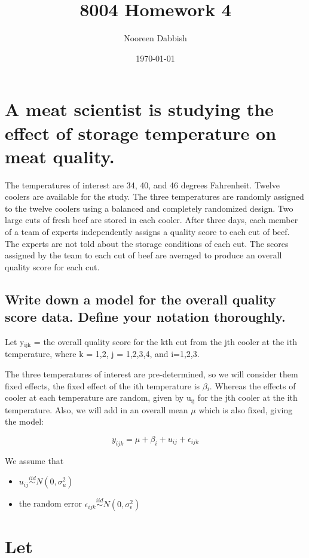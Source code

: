 \documentclass[11pt]{article}
\title{8004 Homework 4}
\author{Nooreen Dabbish}
\date{\today}
\begin{document}
\maketitle




\section{A meat scientist is studying the effect of storage temperature on meat quality.}
\label{sec-1}

The temperatures of interest are 34, 40, and 46 degrees Fahrenheit. Twelve coolers are available for the study. The three temperatures are randomly assigned to the twelve coolers using a balanced and completely randomized design. Two large cuts of fresh beef are stored in each cooler. After three days, each member of a team of experts independently assigns a quality score to each cut of beef. The experts are not told about the storage conditions of each cut. The scores assigned by the team to each cut of beef are averaged to produce an overall quality score for each cut.
\subsection{Write down a model for the overall quality score data. Define your notation thoroughly.}
\label{sec-1-1}


Let y$_{\mathrm{ijk}}$ = the overall quality score for the kth cut from the jth
cooler at the ith temperature, where k = 1,2, j = 1,2,3,4, and
i=1,2,3.

The three temperatures of interest are pre-determined, so we will
consider them fixed effects, the fixed effect of the ith temperature
is $\beta$$_i$. Whereas the effects of cooler at each temperature are
random, given by u$_{\mathrm{ij}}$ for the jth cooler at the ith temperature.
Also, we will add in an overall mean $\mu$ which is also fixed,
giving the model: 

$$y_{ijk} = \mu + \beta_i + u_{ij} + \epsilon_{ijk}$$

We assume that 
\begin{itemize}
\item $u_{ij}\overset{iid}\sim N(0,\sigma^2_u)$
\item the random error $\epsilon_{ijk}\overset{iid}\sim N(0,\sigma^2_\epsilon)$
\end{itemize}
\section{Let}
\label{sec-2}
\end{document}
